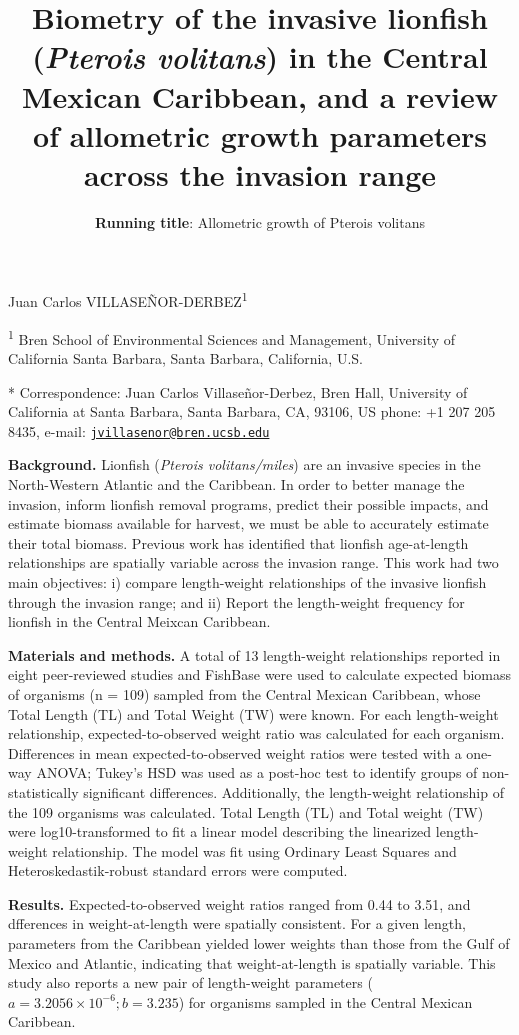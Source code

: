 \documentclass[12pt,]{article}
\title{\Large{Biometry of the invasive lionfish (\textit{Pterois volitans}) in the Central Mexican Caribbean, and a review of allometric growth parameters across the invasion range}}
\subtitle{\textbf{Running title}: Allometric growth of Pterois volitans}
\author{}
\date{}
\begin{document}
\maketitle

Juan Carlos VILLASEÑOR-DERBEZ\textsuperscript{1}

\textsuperscript{1} Bren School of Environmental Sciences and
Management, University of California Santa Barbara, Santa Barbara,
California, U.S.

* Correspondence: Juan Carlos Villaseñor-Derbez, Bren Hall, University
of California at Santa Barbara, Santa Barbara, CA, 93106, US phone: +1
207 205 8435, e-mail:
\href{mailto:jvillasenor@bren.ucsb.edu}{\nolinkurl{jvillasenor@bren.ucsb.edu}}

\clearpage

\textbf{Background.} Lionfish (\emph{Pterois volitans/miles}) are an
invasive species in the North-Western Atlantic and the Caribbean. In
order to better manage the invasion, inform lionfish removal programs,
predict their possible impacts, and estimate biomass available for
harvest, we must be able to accurately estimate their total biomass.
Previous work has identified that lionfish age-at-length relationships
are spatially variable across the invasion range. This work had two main
objectives: i) compare length-weight relationships of the invasive
lionfish through the invasion range; and ii) Report the length-weight
frequency for lionfish in the Central Meixcan Caribbean.

\textbf{Materials and methods.} A total of 13 length-weight
relationships reported in eight peer-reviewed studies and FishBase were
used to calculate expected biomass of organisms (n = 109) sampled from
the Central Mexican Caribbean, whose Total Length (TL) and Total Weight
(TW) were known. For each length-weight relationship,
expected-to-observed weight ratio was calculated for each organism.
Differences in mean expected-to-observed weight ratios were tested with
a one-way ANOVA; Tukey's HSD was used as a post-hoc test to identify
groups of non-statistically significant differences. Additionally, the
length-weight relationship of the 109 organisms was calculated. Total
Length (TL) and Total weight (TW) were log10-transformed to fit a linear
model describing the linearized length-weight relationship. The model
was fit using Ordinary Least Squares and Heteroskedastik-robust standard
errors were computed.

\textbf{Results.} Expected-to-observed weight ratios ranged from 0.44 to
3.51, and dfferences in weight-at-length were spatially consistent. For
a given length, parameters from the Caribbean yielded lower weights than
those from the Gulf of Mexico and Atlantic, indicating that
weight-at-length is spatially variable. This study also reports a new
pair of length-weight parameters
(\(a = 3.2056\times 10^{-6}; b = 3.235\)) for organisms sampled in the
Central Mexican Caribbean.
\end{document}
